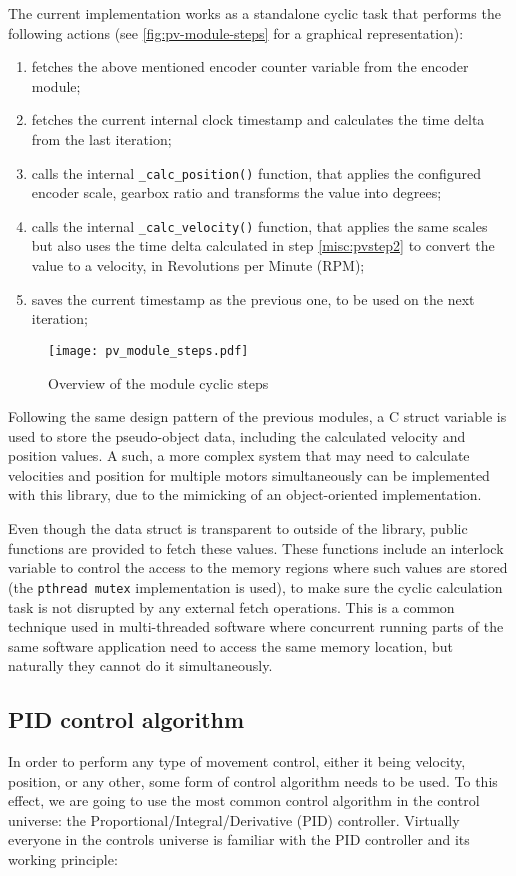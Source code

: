 The current implementation works as a standalone cyclic task that performs the following actions (see \autoref{fig:pv-module-steps} for a graphical representation):
\begin{enumerate}
	\item fetches the above mentioned encoder counter variable from the encoder module;
	\item fetches the current internal clock timestamp and calculates the time delta from the last iteration; \label{misc:pvstep2}
	\item calls the internal \verb|_calc_position()| function, that applies the configured encoder scale, gearbox ratio and transforms the value into degrees;
	\item calls the internal \verb|_calc_velocity()| function, that applies the same scales but also uses the time delta calculated in step \ref{misc:pvstep2} to convert the value to a velocity, in Revolutions per Minute (RPM);
	\item saves the current timestamp as the previous one, to be used on the next iteration;
\end{enumerate}

\begin{figure}[htp]
	\centering
	\texttt{[image: pv\_module\_steps.pdf]}
	\caption{Overview of the module cyclic steps}
	\label{fig:pv-module-steps}
\end{figure}

Following the same design pattern of the previous modules, a C struct variable is used to store the pseudo-object data, including the calculated velocity and position values.
A such, a more complex system that may need to calculate velocities and position for multiple motors simultaneously can be implemented with this library, due to the mimicking of an object-oriented implementation.

Even though the data struct is transparent to outside of the library, public functions are provided to fetch these values.
These functions include an interlock variable to control the access to the memory regions where such values are stored (the \verb|pthread mutex| implementation is used), to make sure the cyclic calculation task is not disrupted by any external fetch operations.
This is a common technique used in multi-threaded software where concurrent running parts of the same software application need to access the same memory location, but naturally they cannot do it simultaneously.

\subsection{PID control algorithm}
In order to perform any type of movement control, either it being velocity, position, or any other, some form of control algorithm needs to be used.
To this effect, we are going to use the most common control algorithm in the control universe: the Proportional/Integral/Derivative (PID) controller.
Virtually everyone in the controls universe is familiar with the PID controller and its working principle:

